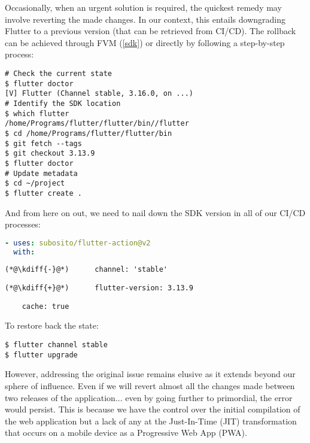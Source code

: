 Occasionally, when an urgent solution is required, the quickest remedy may involve reverting  the made 
changes. In our context, this entails downgrading Flutter to a previous version (that can be retrieved from CI/CD). 
The rollback can be achieved through FVM (\ref{sdk}) or directly by following a step-by-step process:

\begin{lstlisting}[language=terminal]
# Check the current state
$ flutter doctor
[V] Flutter (Channel stable, 3.16.0, on ...)
# Identify the SDK location
$ which flutter
/home/Programs/flutter/flutter/bin//flutter
$ cd /home/Programs/flutter/flutter/bin
$ git fetch --tags
$ git checkout 3.13.9
$ flutter doctor
# Update metadata
$ cd ~/project
$ flutter create .
\end{lstlisting}

\noindent And from here on out, we need to nail down the SDK version in all of our CI/CD processes:

\begin{lstlisting}[language=yaml]
- uses: subosito/flutter-action@v2
  with:
\end{lstlisting}
{
\xpretocmd{\lstlisting}{\vspace{-12pt}}{}{}
\begin{lstlisting}[firstnumber=2, backgroundcolor=\color{backred}]
(*@\kdiff{-}@*)      channel: 'stable'
\end{lstlisting}
\begin{lstlisting}[firstnumber=2, backgroundcolor=\color{backgreen}]
(*@\kdiff{+}@*)      flutter-version: 3.13.9
\end{lstlisting}
\begin{lstlisting}
    cache: true
\end{lstlisting}
}

\noindent To restore back the state:

\begin{lstlisting}[language=terminal]
$ flutter channel stable
$ flutter upgrade
\end{lstlisting}

\noindent However, addressing the original issue remains elusive as it extends beyond our sphere of influence. Even if 
we will revert almost all the changes made between two releases of the application... even by going further to primordial, 
the error would persist. This is because we have the control over the initial compilation of the web application but a 
lack of any at the Just-In-Time (JIT) transformation that occurs on a mobile device as a Progressive Web App (PWA).

